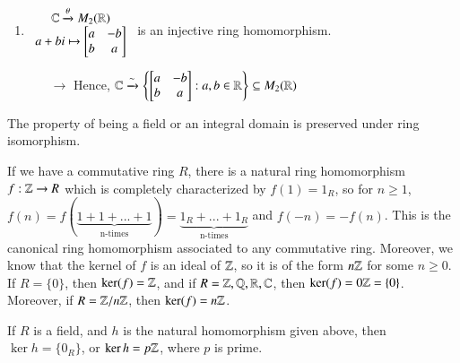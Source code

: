 \begin{example}
\begin{enumerate}
\begin{proof}
            Hence, we find that $\phi$ is a ring homomorphism. Finally, if $[k]_p \in \ker(\phi)$, then $k\;\vert\;p$, which implies $[k]_p = [0]_p$ so $\ker(\phi) = \{[0]_p\}$, and since both sets are finite (and of the same order) we conclude that $\phi$ is a bijection. Therefore, $\phi$ is a ring isomorphism so $R \cong \F_p$, as claimed.
        \end{proof}
        \item $\begin{array}{c} \mathbb C\xrightarrow{\theta}M_2(\mathbb R) \\ a+bi\mapsto \begin{bmatrix} a & -b \\ b & a\end{bmatrix} \end{array}$ is an injective ring homomorphism.
        \begin{enumerate}
            \item[$\rightarrow$] Hence, $\mathbb C \xrightarrow{\sim} \left\{\begin{bmatrix} a & -b \\ b & a\end{bmatrix}:a,b \in \mathbb R\right\}\subseteq M_2(\mathbb R)$ 
        \end{enumerate}
    \end{enumerate}
\end{example}

\begin{remark}
    The property of being a field or an integral domain is preserved under ring isomorphism.
\end{remark}


\begin{remark}
        If we have a commutative ring $R$, there is a natural ring homomorphism $f:\mathbb Z\rightarrow R$ which is completely characterized by $f(1) = 1_R$, so for $n \geq 1$, $f(n) = f(\underbrace{1+1+...+1}_{\text{n-times}}) = \underbrace{1_R+...+1_R}_{\text{n-times}}$ and $f(-n) = -f(n)$. This is the canonical ring homomorphism associated to any commutative ring. Moreover, we know that the kernel of $f$ is an ideal of $\mathbb Z$, so it is of the form $n\mathbb Z$ for some $n \geq 0$. If $R = \{0\}$, then $\ker(f) =\mathbb Z$, and if $R = \mathbb Z,\mathbb Q,\mathbb R,\mathbb C$, then $\ker(f) = 0\mathbb Z = \{0\}$. Moreover, if $R= \mathbb Z/n\mathbb Z$, then $\ker(f) = n\mathbb Z$.
\end{remark}

\begin{remark}
        If $R$ is a field, and $h$ is the natural homomorphism given above, then $\ker h = \{0_R\}$, or $\ker h = p\mathbb Z$, where $p$ is prime.
\end{remark}


